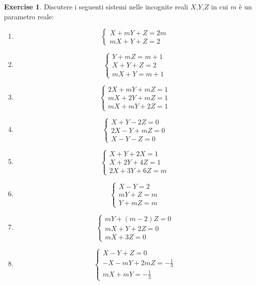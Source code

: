 \documentclass{article}
\theoremstyle{plain}
\theoremstyle{definition}
\newtheorem{xca}[exmp]{Exercise}
\theoremstyle{remark}
\begin{document}
\vspace{10pt}

\begin{bxthm}
\begin{xca}
    Discutere i seguenti sistemi nelle incognite reali $X$,$Y$,$Z$ in cui $m$ è un parametro reale:
    \begin{enumerate}
        \item \[\begin{cases}
            X+mY+Z=2m\\
            mX+Y+Z=2
        \end{cases}\]
        \item \[\begin{cases}
            Y+mZ=m+1\\
            X+Y+Z=2\\
            mX+Y=m+1
        \end{cases}\]
        \item \[\begin{cases}
            2X+mY+mZ=1\\
            mX+2Y+mZ=1\\
            mX+mY+2Z=1
        \end{cases}\]
        \item \[\begin{cases}
            X+Y-2Z=0\\
            2X-Y+mZ=0\\
            X-Y-Z=0
        \end{cases}\]
        \item \[\begin{cases}
            X+Y+2X=1\\
            X+2Y+4Z=1\\
            2X+3Y+6Z=m
        \end{cases}\]
        \item \[\begin{cases}
            X-Y=2\\
            mY+Z=m\\
            Y+mZ=m
        \end{cases}\]
        \item \[\begin{cases}
            mY+(m-2)Z=0\\
            mX+Y+2Z=0\\
            mX+3Z=0
        \end{cases}\]
        \item \[\begin{cases}
            X-Y+Z=0\\
            -X-mY+2mZ=-\frac{1}{3}\\
            mX+mY=-\frac{1}{3}
        \end{cases}\]
    \end{enumerate}
\end{xca}
\end{bxthm}
\end{document}
